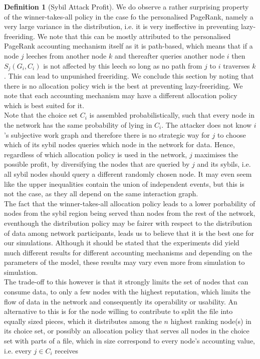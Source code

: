 \documentclass[11pt,a4paper]{report}
\theoremstyle{definition}
\newtheorem{definition}{Definition}[section]
\theoremstyle{theorem}
\theoremstyle{proposition}
\theoremstyle{corollary}
\theoremstyle{lemma}
\theoremstyle{example}
\theoremstyle{remark}
\begin{document}
\begin{definition}[Sybil Attack Profit]
\noindent{}We do observe a rather surprising property of the winner-takes-all policy in the case fo the personalised PageRank, namely a very large variance in the distribution, i.e. it is very ineffective in preventing lazy-freeriding. We note that this can be mostly attributed to the personalised PageRank accounting mechanism itself as it is path-based, which means that if a node $j$ leeches from another node $k$ and thereafter queries another node $i$ then $S_j(G_i,C_i)$ is not affected by this leech so long as no path from $j$ to $i$ traverses $k$. This can lead to unpunished freeriding. We conclude this section by noting that there is no allocation policy wich is the best at preventing lazy-freeriding. We note that each accounting mechanism may have a different allocation policy which is best suited for it. \vspace{1em}\\

\noindent{}Note that the choice set $C_i$ is assembled probabilistically, such that every node in the network has the same probability of lying in $C_i$. The attacker does not know $i$'s subjective work graph and therefore there is no strategic way for $j$ to choose which of its sybil nodes queries which node in the network for data. Hence, regardless of which allocation policy is used in the network, $j$ maximises the possible profit, by diversifying the nodes that are queried by $j$ and its sybils, i.e. all sybil nodes should query a different randomly chosen node. It may even seem like the upper inequalities contain the union of independent events, but this is not the case, as they all depend on the same interaction graph. \vspace{1em}\\
 
\noindent{}The fact that the winner-takes-all allocation policy leads to a lower porbability of nodes from the sybil region being served than nodes from the rest of the network, eventhough the distribution policy may be fairer with respect to the distribution of data among network participants, leads us to believe that it is the best one for our simulations. Although it should be stated that the experiments did yield much different results for different accounting mechanisms and depending on the parameters of the model, these results may vary even more from simulation to simulation. \vspace{1em}\\

\noindent{}The trade-off to this however is that it strongly limits the set of nodes that can consume data, to only a few nodes with the highest reputation, which limits the flow of data in the network and consequently its operability or usability. An alternative to this is for the node willing to contribute to split the file into equally sized pieces, which it distributes among the $n$ highest ranking node(s) in its choice set, or possibly an allocation policy that serves all nodes in the choice set with parts of a file, which in size correspond to every node's accounting value, i.e. every $j\in{}C_i$ receives


\end{definition}
\end{document}
